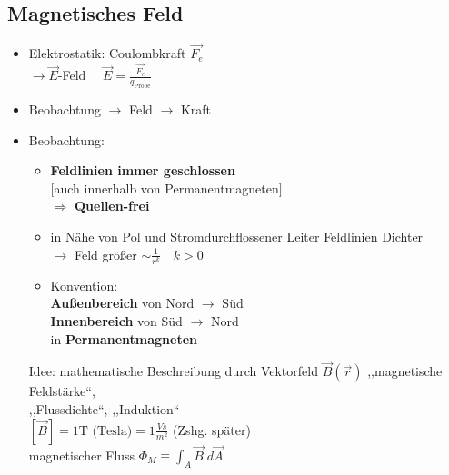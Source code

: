 \documentclass[titlepage,12pt,a4paper,ngerman]{report}
\newcommand{\tx}[1]{\textrm{#1}}
\begin{document}
\subsection{Magnetisches Feld}
\begin{itemize}
	\item Elektrostatik: Coulombkraft $ \vec{F_e} $ \\
	$ \rightarrow \vec{E} $-Feld $ \quad \vec{E} = \frac{\vec{F_e}}{q_{\tx{Probe}}} $
	\item Beobachtung $ \rightarrow $ Feld $ \rightarrow $ Kraft
\end{itemize}
\begin{itemize}
	\item Beobachtung:
	\begin{itemize}
		\item \textbf{Feldlinien immer geschlossen}\\
		$[$auch innerhalb von Permanentmagneten$]$\\
		$ \Rightarrow $ \textbf{Quellen-frei}
		\item in Nähe von Pol und Stromdurchflossener Leiter Feldlinien Dichter\\
		$ \rightarrow $ Feld größer $ \sim \frac{1}{r^k} \quad k> 0 $
		\item Konvention: \\
		\textbf{Außenbereich} von Nord $ \rightarrow $ Süd\\
		\textbf{Innenbereich} von Süd $ \rightarrow $ Nord\\
		in \textbf{Permanentmagneten}
	\end{itemize}
	Idee: mathematische Beschreibung durch Vektorfeld $ \vec{B}(\vec{r}) $ ,,magnetische Feldstärke``,\\ ,,Flussdichte``, ,,Induktion``\\
	$ [\vec{B}] = 1 \tx{T (Tesla)} = 1 \frac{Vs}{m^2} $ (Zshg. später)\\magnetischer Fluss $ \Phi_M \equiv \int_A \vec{B} \; d \vec{A} $
\end{itemize}


\end{document}
